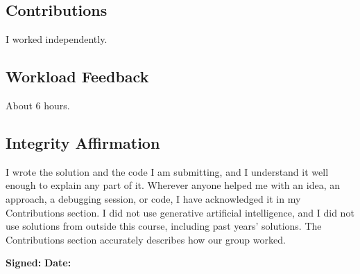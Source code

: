 \documentclass[12pt]{article}
\numberwithin{equation}{subsection}
\begin{document}
\subsection*{Contributions}
I worked independently.

\subsection*{Workload Feedback}
About 6 hours.

\subsection*{Integrity Affirmation}
I wrote the solution and the code I am submitting, and I understand it well enough to explain any part of it. Wherever anyone helped me with an idea, an approach, a debugging session, or code, I have acknowledged it in my Contributions section. I did not use generative artificial intelligence, and I did not use solutions from outside this course, including past years' solutions. The Contributions section accurately describes how our group worked.
\vspace{0.5em}

\noindent\textbf{Signed:} \underline{} \quad \textbf{Date:} \underline{}
\end{document}
